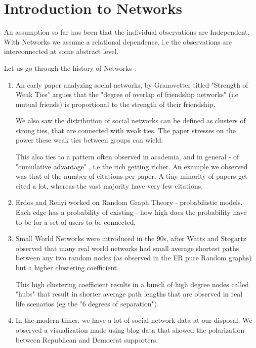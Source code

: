\section{Introduction to Networks}
An assumption so far has been that the individual observations are Independent. With Networks we assume a relational dependence, i.e the observations are interconnected at some abstract level. 

Let us go through the history of Networks :
\begin{enumerate}
  \item An early paper analyzing social networks, by Granovetter titled "Strength of Weak Ties" argues that the "degree of overlap of friendship networks" (i.e mutual friends) is proportional to the strength of their friendship. 
  
  We also saw the distribution of social networks can be defined as clusters of strong ties, that are connected with weak ties. The paper stresses on the power these weak ties between groups can wield.
  
  This also ties to a pattern often observed in academia, and in general - of "cumulative advantage" , i.e the rich getting richer. An example we observed was that of the number of citations per paper. A tiny minority of papers get cited a lot, whereas the vast majority have very few citations.
  
  \item Erdos and Renyi worked on Random Graph Theory - probabilistic models. Each edge has a probability of existing - how high does the probability have to be for a set of users to be connected.
  
  \item Small World Networks were introduced in the 90s, after Watts and Stogartz observed that many real world networks had small average shortest paths between any two random nodes (as observed in the ER pure Random graphs) but a higher clustering coefficient. 
  
  This high clustering coefficient results in a bunch of high degree nodes called "hubs" that result in shorter average path lengths that are observed in real life scenarios (eg the "6 degrees of separation").
    
  \item In the modern times, we have a lot of social network data at our disposal. We observed a visualization made using blog data that showed the polarization between Republican and Democrat supporters.
  
\end{enumerate}

